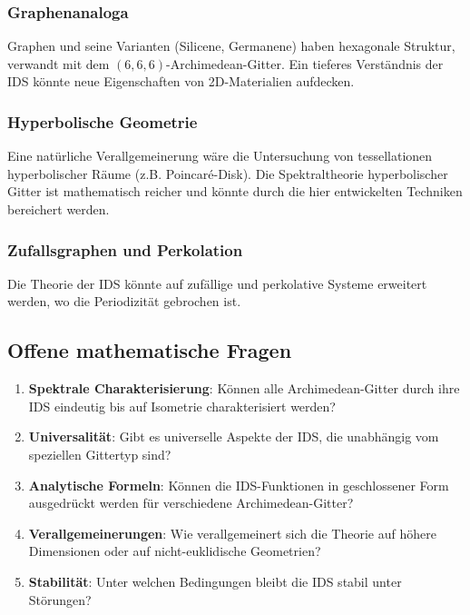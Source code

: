 \documentclass[a4paper,12pt]{article}
\theoremstyle{definition}
\begin{document}
\subsubsection{Graphenanaloga}

Graphen und seine Varianten (Silicene, Germanene) haben hexagonale Struktur, verwandt mit dem $(6,6,6)$-Archimedean-Gitter. Ein tieferes Verständnis der IDS könnte neue Eigenschaften von 2D-Materialien aufdecken.

\subsubsection{Hyperbolische Geometrie}

Eine natürliche Verallgemeinerung wäre die Untersuchung von tessellationen hyperbolischer Räume (z.B. Poincaré-Disk). Die Spektraltheorie hyperbolischer Gitter ist mathematisch reicher und könnte durch die hier entwickelten Techniken bereichert werden.

\subsubsection{Zufallsgraphen und Perkolation}

Die Theorie der IDS könnte auf zufällige und perkolative Systeme erweitert werden, wo die Periodizität gebrochen ist.

\subsection{Offene mathematische Fragen}

\begin{enumerate}
	\item \textbf{Spektrale Charakterisierung}: Können alle Archimedean-Gitter durch ihre IDS eindeutig bis auf Isometrie charakterisiert werden?
	
	\item \textbf{Universalität}: Gibt es universelle Aspekte der IDS, die unabhängig vom speziellen Gittertyp sind?
	
	\item \textbf{Analytische Formeln}: Können die IDS-Funktionen in geschlossener Form ausgedrückt werden für verschiedene Archimedean-Gitter?
	
	\item \textbf{Verallgemeinerungen}: Wie verallgemeinert sich die Theorie auf höhere Dimensionen oder auf nicht-euklidische Geometrien?
	
	\item \textbf{Stabilität}: Unter welchen Bedingungen bleibt die IDS stabil unter Störungen?
\end{enumerate}
\end{document}
